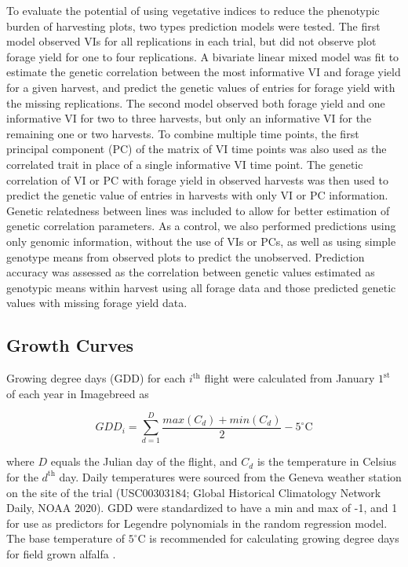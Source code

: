 \documentclass[12pt, letterpaper]{article}
\begin{document}

To evaluate the potential of using vegetative indices to reduce the phenotypic burden of harvesting plots, two types prediction models were tested. The first model observed VIs for all replications in each trial, but did not observe plot forage yield for one to four replications. A bivariate linear mixed model was fit to estimate the genetic correlation between the most informative VI and forage yield for a given harvest, and predict the genetic values of entries for forage yield with the missing replications. The second model observed both forage yield and one informative VI for two to three harvests, but only an informative VI for the remaining one or two harvests. To combine multiple time points, the first principal component (PC) of the matrix of VI time points was also used as the correlated trait in place of a single informative VI time point. The genetic correlation of VI or PC with forage yield in observed harvests was then used to predict the genetic value of entries in harvests with only VI or PC information. Genetic relatedness between lines was included to allow for better estimation of genetic correlation parameters. As a control, we also performed predictions using only genomic information, without the use of VIs or PCs, as well as using simple genotype means from observed plots to predict the unobserved.  Prediction accuracy was assessed as the correlation between genetic values estimated as genotypic means within harvest using all forage data and those predicted genetic values with missing forage yield data.

\subsection{Growth Curves}

Growing degree days (GDD) for each $i^\text{th}$ flight were calculated from January $1^\text{st}$ of each year in Imagebreed as 

\begin{equation} \label{gdd}
GDD_i = \sum^D_{d = 1} \frac{max(C_d) + min(C_d)}{2} - 5^\circ \text{C}
\end{equation}

\noindent where $D$ equals the Julian day of the flight, and $C_d$ is the temperature in Celsius for the $d^\text{th}$ day. Daily temperatures were sourced from the Geneva weather station on the site of the trial (USC00303184; Global Historical Climatology Network Daily, NOAA 2020). GDD were standardized to have a min and max of -1, and 1 for use as predictors for Legendre polynomials in the random regression model. The base temperature of $5^\circ \text{C}$ is recommended for calculating growing degree days for field grown alfalfa \parencite{sharratt1989}.
\end{document}
